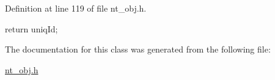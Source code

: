 Definition at line 119 of file nt\_\-obj.h.




\begin{DoxyCode}
{
  return uniqId;
}
\end{DoxyCode}




The documentation for this class was generated from the following file:\begin{DoxyCompactItemize}
\item 
\hyperlink{nt__obj_8h}{nt\_\-obj.h}\end{DoxyCompactItemize}
